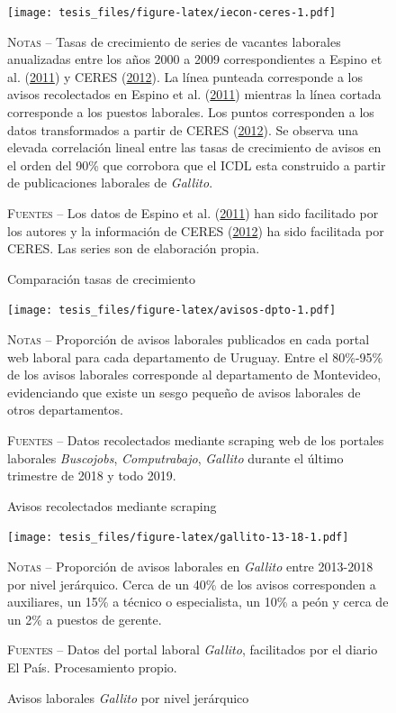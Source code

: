 \documentclass[12pt,oneside]{reedthesis}
\begin{document}
\begin{figure}
\texttt{[image: tesis\_files/figure-latex/iecon-ceres-1.pdf]}
\caption{Comparación tasas de crecimiento}\label{fig:iecon-ceres}\textsc{}

\footnotesize\textsc{Notas} -- Tasas de crecimiento de series de vacantes laborales anualizadas entre los años 2000 a 2009 correspondientes a Espino et al. (\protect\hyperlink{ref-Alma2011}{2011}) y CERES (\protect\hyperlink{ref-Ceres2012}{2012}). La línea punteada corresponde a los avisos recolectados en Espino et al. (\protect\hyperlink{ref-Alma2011}{2011}) mientras la línea cortada corresponde a los puestos laborales. Los puntos corresponden a los datos transformados a partir de CERES (\protect\hyperlink{ref-Ceres2012}{2012}). Se observa una elevada correlación lineal entre las tasas de crecimiento de avisos en el orden del 90\% que corrobora que el ICDL esta construido a partir de publicaciones laborales de \textit{Gallito}.

\textsc{Fuentes} -- Los datos de Espino et al. (\protect\hyperlink{ref-Alma2011}{2011}) han sido facilitado por los autores y la información de CERES (\protect\hyperlink{ref-Ceres2012}{2012}) ha sido facilitada por CERES. Las series son de elaboración propia.
\end{figure}
\begin{figure}
\texttt{[image: tesis\_files/figure-latex/avisos-dpto-1.pdf]}
\caption{Avisos recolectados mediante scraping}\label{fig:avisos-dpto}\textsc{}

\footnotesize\textsc{Notas} -- Proporción de avisos laborales publicados en cada portal web laboral para cada departamento de Uruguay. Entre el 80\%-95\% de los avisos laborales corresponde al departamento de Montevideo, evidenciando que existe un sesgo pequeño de avisos laborales de otros departamentos.

\textsc{Fuentes} -- Datos recolectados mediante scraping web de los portales laborales \textit{Buscojobs}, \textit{Computrabajo}, \textit{Gallito} durante el último trimestre de 2018 y todo 2019.
\end{figure}
\begin{figure}
\texttt{[image: tesis\_files/figure-latex/gallito-13-18-1.pdf]}
\caption{Avisos laborales \textit{Gallito} por nivel jerárquico}\label{fig:gallito-13-18}\textsc{}

\footnotesize\textsc{Notas} -- Proporción de avisos laborales en \textit{Gallito} entre 2013-2018 por nivel jerárquico. Cerca de un 40\% de los avisos corresponden a auxiliares, un 15\% a técnico o especialista, un 10\% a peón y cerca de un 2\% a puestos de gerente.

\textsc{Fuentes} -- Datos del portal laboral \textit{Gallito}, facilitados por el diario El País. Procesamiento propio.
\end{figure}
\newpage
\end{document}
